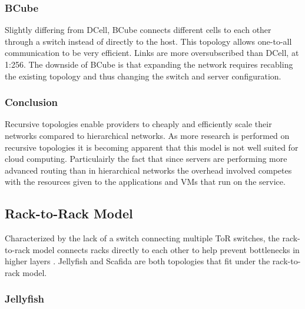 \documentclass[fullapage,12pt]{article}
\begin{document}


\subsubsection{BCube} \label{subp:bcube}

Slightly differing from DCell, BCube connects different cells to each other through a switch instead of directly to the host. This topology allows one-to-all communication to be very efficient. Links are more oversubscribed than DCell, at 1:256. The downside of BCube is that expanding the network requires recabling the existing topology and thus changing the switch and server configuration.


\subsubsection{Conclusion} \label{ssub:recursive-concl}



Recursive topologies enable providers to cheaply and efficiently scale their networks compared to hierarchical networks. As more research is performed on recursive topologies it is becoming apparent that this model is not well suited for cloud computing. Particulairly the fact that since servers are performing more advanced routing than in hierarchical networks the overhead involved competes with the resources given to the applications and VMs that run on the service.


\subsection{Rack-to-Rack Model} \label{sub:net-rack}

Characterized by the lack of a switch connecting multiple ToR switches, the rack-to-rack model connects racks directly to each other to help prevent bottlenecks in higher layers \cite{wang2015survey, xia2016survey}. Jellyfish \cite{singla2012jellyfish} and Scafida \cite{gyarmati2010scafida} are both topologies that fit under the rack-to-rack model.


\subsubsection{Jellyfish} \label{subp:jellyfish}
\end{document}
